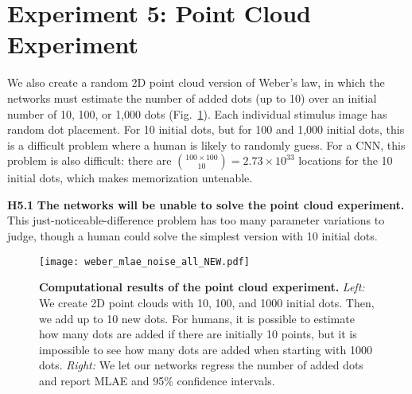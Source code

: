 \section{Experiment 5: Point Cloud Experiment}
\label{sec:weberslaw}


We also create a random 2D point cloud version of Weber's law, in which the networks must estimate the number of added dots (up to 10) over an initial number of 10, 100, or 1,000 dots (Fig.~\ref{fig:weber_law}). Each individual stimulus image has random dot placement. For 10 initial dots,  but for 100 and 1,000 initial dots, this is a difficult problem where a human is likely to randomly guess. For a CNN, this problem is also difficult: there are $\binom{100\times100}{10}=2.73\times10^{33}$ locations for the 10 initial dots, which makes memorization untenable.


\begin{hypolist}
	\item \textbf{H5.1} \textbf{The networks will be unable to solve the point cloud experiment.} This just-noticeable-difference problem has too many parameter variations to judge, though a human could solve the simplest version with 10 initial dots.
\end{hypolist}


\begin{figure}[tb]
  \centering
  \texttt{[image: weber\_mlae\_noise\_all\_NEW.pdf]}
  \caption{\textbf{Computational results of the point cloud experiment.} \textit{Left:} We create 2D point clouds with 10, 100, and 1000 initial dots. Then, we add up to 10 new dots. For humans, it is possible to estimate how many dots are added if there are initially 10 points, but it is impossible to see how many dots are added when starting with 1000 dots. \textit{Right:} We let our networks regress the number of added dots and report MLAE and  95\% confidence intervals.}
	\label{fig:weber_law}
\end{figure}

